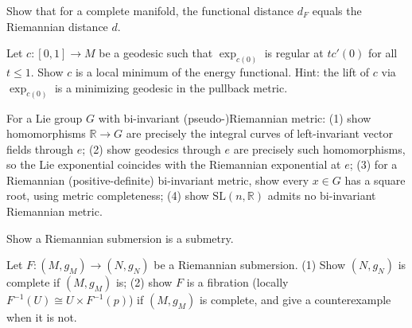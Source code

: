\begin{remark}
  \label{rem:pet-ch5-ex-33}
  Show that for a complete manifold, the functional distance $d_F$ equals the
  Riemannian distance $d$.
\end{remark}

\begin{remark}
  \label{rem:pet-ch5-ex-34}
  Let $c:[0,1]\to M$ be a geodesic such that $\exp_{c(0)}$ is regular at $tc'(0)$
  for all $t\le1$. Show $c$ is a local minimum of the energy functional. Hint: the
  lift of $c$ via $\exp_{c(0)}$ is a minimizing geodesic in the pullback metric.
\end{remark}

\begin{remark}
  \label{rem:pet-ch5-ex-35}
  For a Lie group $G$ with bi-invariant (pseudo-)Riemannian metric: (1) show
  homomorphisms $\mathbb R\to G$ are precisely the integral curves of left-invariant
  vector fields through $e$; (2) show geodesics through $e$ are precisely such
  homomorphisms, so the Lie exponential coincides with the Riemannian exponential
  at $e$; (3) for a Riemannian (positive-definite) bi-invariant metric, show every
  $x\in G$ has a square root, using metric completeness; (4) show
  $\mathrm{SL}(n,\mathbb R)$ admits no bi-invariant Riemannian metric.
\end{remark}

\begin{remark}
  \label{rem:pet-ch5-ex-36}
  Show a Riemannian submersion is a submetry.
\end{remark}

\begin{remark}
  \label{rem:pet-ch5-ex-37}
  Let $F:(M,g_M)\to(N,g_N)$ be a Riemannian submersion. (1) Show $(N,g_N)$ is
  complete if $(M,g_M)$ is; (2) show $F$ is a fibration (locally
  $F^{-1}(U)\cong U\times F^{-1}(p)$) if $(M,g_M)$ is complete, and give a
  counterexample when it is not.
\end{remark}

